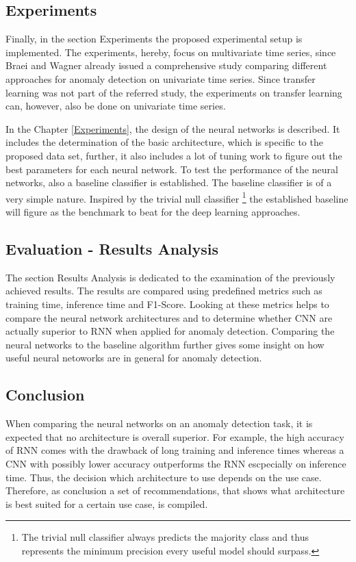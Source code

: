 \subsection{Experiments}
Finally, in the section Experiments the proposed experimental setup is implemented. The experiments, hereby, focus on multivariate time series, since Braei and Wagner \parencite*{Braei2020} already issued a comprehensive study comparing different approaches for anomaly detection on univariate time series. Since transfer learning was not part of the referred study, the experiments on transfer learning can, however, also be done on univariate time series. 

In the Chapter \ref{Experiments}, the design of the neural networks is described. It includes the determination of the basic architecture, which is specific to the proposed data set, further, it also includes a lot of tuning work to figure out the best parameters for each neural network. To test the performance of the neural networks, also a baseline classifier is established. The baseline classifier is of a very simple nature. Inspired by the trivial null classifier \footnote{The trivial null classifier always predicts the majority class and thus represents the minimum precision every useful model should surpass.} the established baseline will figure as the benchmark to beat for the deep learning approaches. 

\subsection{Evaluation - Results Analysis}
The section Results Analysis is dedicated to the examination of the previously achieved results. The results are compared using predefined metrics such as training time, inference time and F1-Score. Looking at these metrics helps to compare the neural network architectures and to determine whether CNN are actually superior to RNN when applied for anomaly detection. Comparing the neural networks to the baseline algorithm further gives some insight on how useful neural netoworks are in general for anomaly detection.

\subsection{Conclusion}
When comparing the neural networks on an anomaly detection task, it is expected that no architecture is overall superior. For example, the high accuracy of RNN comes with the drawback of long training and inference times whereas a CNN with possibly lower accuracy outperforms the RNN escpecially on inference time. Thus, the decision which architecture to use depends on the use case. Therefore, as conclusion a set of recommendations, that shows what architecture is best suited for a certain use case, is compiled.


